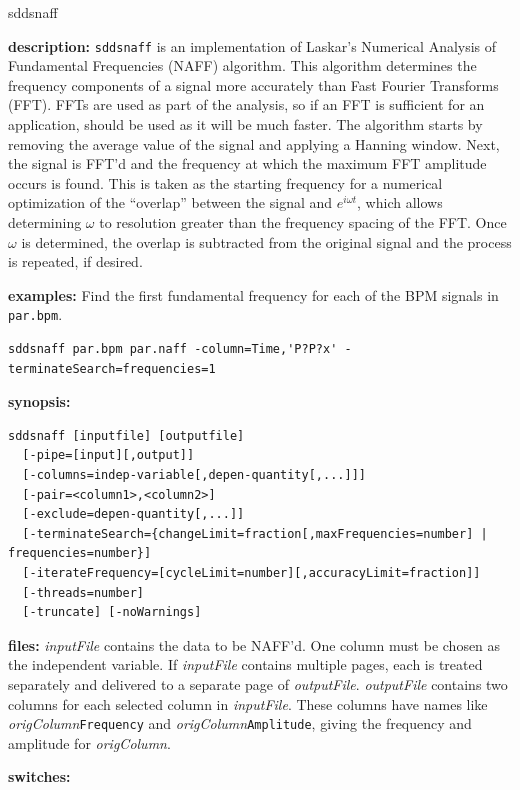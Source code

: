 \begin{sddsprog}{sddsnaff}
  \item \textbf{description:}
    \verb|sddsnaff| is an implementation of Laskar's Numerical Analysis of Fundamental
    Frequencies (NAFF) algorithm. This algorithm determines the frequency components
    of a signal more accurately than Fast Fourier Transforms (FFT). FFTs are used as
    part of the analysis, so if an FFT is sufficient for an application, 
    should be used as it will be much faster.
    The algorithm starts by removing the average value of the signal and applying a
    Hanning window. Next, the signal is FFT'd and the frequency at which the maximum
    FFT amplitude occurs is found. This is taken as the starting frequency for a
    numerical optimization of the ``overlap'' between the signal and $e^{i\omega t}$,
    which allows determining $\omega$ to resolution greater than the frequency spacing
    of the FFT. Once $\omega$ is determined, the overlap is subtracted from the
    original signal and the process is repeated, if desired.
  \item \textbf{examples:}
    Find the first fundamental frequency for each of the BPM signals in \verb|par.bpm|.
    \begin{verbatim}
sddsnaff par.bpm par.naff -column=Time,'P?P?x' -terminateSearch=frequencies=1
    \end{verbatim}
  \item \textbf{synopsis:}
    \begin{verbatim}
sddsnaff [inputfile] [outputfile]
  [-pipe=[input][,output]]
  [-columns=indep-variable[,depen-quantity[,...]]]
  [-pair=<column1>,<column2>]
  [-exclude=depen-quantity[,...]]
  [-terminateSearch={changeLimit=fraction[,maxFrequencies=number] | frequencies=number}]
  [-iterateFrequency=[cycleLimit=number][,accuracyLimit=fraction]]
  [-threads=number]
  [-truncate] [-noWarnings]
    \end{verbatim}
  \item \textbf{files:}
    \emph{inputFile} contains the data to be NAFF'd. One column must be chosen as the
    independent variable. If \emph{inputFile} contains multiple pages, each is treated
    separately and delivered to a separate page of \emph{outputFile}.
    \emph{outputFile} contains two columns for each selected column in \emph{inputFile}.
    These columns have names like \emph{origColumn}\verb|Frequency| and
    \emph{origColumn}\verb|Amplitude|, giving the frequency and amplitude for
    \emph{origColumn}.
  \item \textbf{switches:}

\end{sddsprog}

